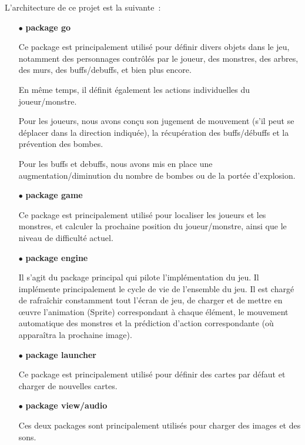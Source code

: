 \documentclass[11pt,english]{article}
\begin{document}
\indent

L'architecture de ce projet est la suivante :

\begin{itemize}
    \item [$\bullet$] \textbf{package go}
    
    Ce package est principalement utilisé pour définir divers objets dans le jeu, notamment des personnages contrôlés par le joueur, des monstres, des arbres, des murs, des buffs/debuffs, et bien plus encore.
    
    En même temps, il définit également les actions individuelles du joueur/monstre. 

    Pour les joueurs, nous avons conçu son jugement de mouvement (s'il peut se déplacer dans la direction indiquée), la récupération des buffs/débuffs et la prévention des bombes.

    Pour les buffs et debuffs, nous avons mis en place une augmentation/diminution du nombre de bombes ou de la portée d'explosion.

    \item [$\bullet$] \textbf{package game}
    
    Ce package est principalement utilisé pour localiser les joueurs et les monstres, et calculer la prochaine position du joueur/monstre, ainsi que le niveau de difficulté actuel.

    \item [$\bullet$] \textbf{package engine}
    
    Il s'agit du package principal qui pilote l'implémentation du jeu. Il implémente principalement le cycle de vie de l’ensemble du jeu. Il est chargé de rafraîchir constamment tout l'écran de jeu, de charger et de mettre en œuvre l'animation (Sprite) correspondant à chaque élément, le mouvement automatique des monstres et la prédiction d'action correspondante (où apparaîtra la prochaine image).

    \item [$\bullet$] \textbf{package launcher}
    
    Ce package est principalement utilisé pour définir des cartes par défaut et charger de nouvelles cartes.

    \item [$\bullet$] \textbf{package view/audio}
    
    Ces deux packages sont principalement utilisés pour charger des images et des sons.
    

\end{itemize}
\end{document}
